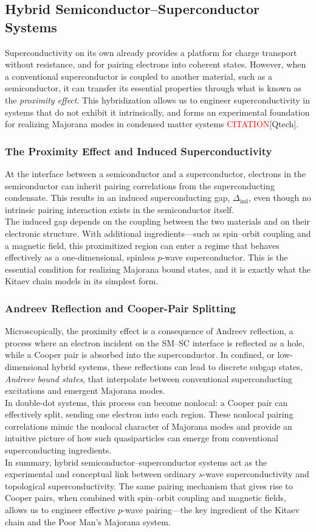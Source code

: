 \documentclass[11pt, letterpaper, titlepage]{article}
\begin{document}
\subsection{Hybrid Semiconductor–Superconductor Systems}
Superconductivity on its own already provides a platform for charge transport without resistance, and for pairing electrons into coherent states. However, when a conventional superconductor is coupled to another material, such as a semiconductor, it can transfer its essential properties through what is known as the \textit{proximity effect}. This hybridization allows us to engineer superconductivity in systems that do not exhibit it intrinsically, and forms an experimental foundation for realizing Majorana modes in condensed matter systems \textcolor{red}{CITATION}[Qtech].
\subsubsection{The Proximity Effect and Induced Superconductivity}
At the interface between a semiconductor and a superconductor, electrons in the semiconductor can inherit pairing correlations from the superconducting condensate. This results in an induced superconducting gap, $Δ_{\mathrm{ind}}$, even though no intrinsic pairing interaction exists in the semiconductor itself. \\
The induced gap depends on the coupling between the two materials and on their electronic structure. With additional ingredients—such as spin–orbit coupling and a magnetic field, this proximitized region can enter a regime that behaves effectively as a one-dimensional, spinless $p$-wave superconductor. This is the essential condition for realizing Majorana bound states, and it is exactly what the Kitaev chain models in its simplest form.
\subsubsection{Andreev Reflection and Cooper-Pair Splitting}
Microscopically, the proximity effect is a consequence of Andreev reflection, a process where an electron incident on the SM–SC interface is reflected as a hole, while a Cooper pair is absorbed into the superconductor. In confined, or low-dimensional hybrid systems, these reflections can lead to discrete subgap states, \textit{Andreev bound states}, that interpolate between conventional superconducting excitations and emergent Majorana modes.\\
In double-dot systems, this process can become nonlocal: a Cooper pair can effectively split, sending one electron into each region. These nonlocal pairing correlations mimic the nonlocal character of Majorana modes and provide an intuitive picture of how such quasiparticles can emerge from conventional superconducting ingredients.\\
In summary, hybrid semiconductor–superconductor systems act as the experimental and conceptual link between ordinary $s$-wave superconductivity and topological superconductivity. The same pairing mechanism that gives rise to Cooper pairs, when combined with spin–orbit coupling and magnetic fields, allows us to engineer effective $p$-wave pairing—the key ingredient of the Kitaev chain and the Poor Man’s Majorana system.
\end{document}
